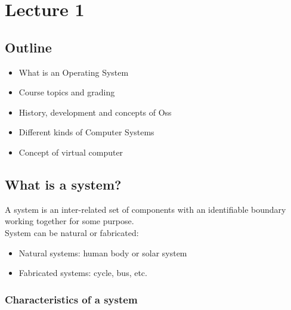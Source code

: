 \chapter{Lecture 1}

\section{Outline}

\begin{itemize}
    \item What is an Operating System
    \item Course topics and grading
    \item History, development and concepts of Oss
    \item Different kinds of Computer Systems
    \item Concept of virtual computer
\end{itemize}

\section{What is a system?}

A system is an inter-related set of components with an identifiable
boundary working together for some purpose.\\

System can be natural or fabricated:
\begin{itemize}
    \item Natural systems: human body or solar system
    \item Fabricated systems: cycle, bus, etc.
\end{itemize}

\subsection{Characteristics of a system}

